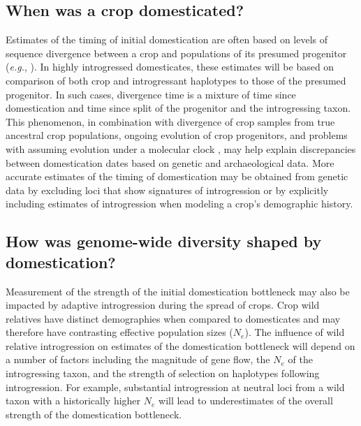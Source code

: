 \documentclass[11pt]{article}
\begin{document}
\subsection*{When was a crop domesticated?}
Estimates of the timing of initial domestication are often based on levels of sequence divergence between a crop and populations of its presumed progenitor (\emph{e.g.}, \cite{matsuoka2002single, molina2011molecular}).
In highly introgressed domesticates, these estimates will be based on comparison of both crop and introgressant haplotypes to those of the presumed progenitor.
In such cases, divergence time is a mixture of time since domestication and time since split of the progenitor and the introgressing taxon.
This phenomenon, in combination with divergence of crop samples from true ancestral crop populations, ongoing evolution of crop progenitors, and problems with assuming evolution under a molecular clock \cite{Zeder2006}, may help explain discrepancies between domestication dates based on genetic and archaeological data.
More accurate estimates of the timing of domestication may be obtained from genetic data by excluding loci that show signatures of introgression or by explicitly including estimates of introgression when modeling a crop's demographic history.

\subsection*{How was genome-wide diversity shaped by domestication?}

Measurement of the strength of the initial domestication bottleneck may also be impacted by adaptive introgression during the spread of crops.
Crop wild relatives have distinct demographies when compared to domesticates and may therefore have contrasting effective population sizes ($N_e$).
The influence of wild relative introgression on estimates of the domestication bottleneck will depend on a number of factors including the magnitude of gene flow, the $N_e$ of the introgressing taxon, and the strength of selection on haplotypes following introgression.
For example, substantial introgression at neutral loci from a wild taxon with a historically higher $N_e$ will lead to underestimates of the overall strength of the domestication bottleneck.
\end{document}
